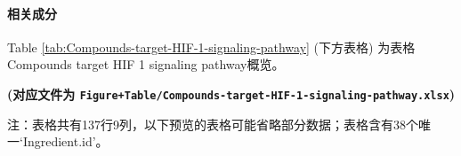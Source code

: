 \documentclass[
]{article}
\begin{document}
\hypertarget{ux76f8ux5173ux6210ux5206}{%
\paragraph{相关成分}\label{ux76f8ux5173ux6210ux5206}}

Table \ref{tab:Compounds-target-HIF-1-signaling-pathway} (下方表格) 为表格Compounds target HIF 1 signaling pathway概览。

\textbf{(对应文件为 \texttt{Figure+Table/Compounds-target-HIF-1-signaling-pathway.xlsx})}

\begin{center}\begin{tcolorbox}[colback=gray!10, colframe=gray!50, width=0.9\linewidth, arc=1mm, boxrule=0.5pt]注：表格共有137行9列，以下预览的表格可能省略部分数据；表格含有38个唯一`Ingredient.id'。
\end{tcolorbox}
\end{center}
\end{document}
